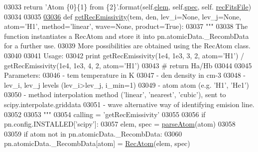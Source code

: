 \begin{DoxyCode}
{{{{{{{{{{{{{{{{{{{{{{03033         \textcolor{keywordflow}{return} \textcolor{stringliteral}{'Atom \{0\}\{1\} from \{2\}'}.format(self.\hyperlink{classpyneb_1_1core_1_1pynebcore_1_1_rec_atom_a1325fff2854658752d522c7284df5a8a}{elem}, self.\hyperlink{classpyneb_1_1core_1_1pynebcore_1_1_rec_atom_ac2485287f7694915959ba49b9b82e483}{spec}, self.
      \hyperlink{classpyneb_1_1core_1_1pynebcore_1_1_rec_atom_a2108a27da329b8599357e990a446faae}{recFitsFile})
03034         
03035 
\hypertarget{pynebcore_8py_source_l03036}{}\hyperlink{namespacepyneb_1_1core_1_1pynebcore_aba9d4a5306330dd47f8a51455514c017}{03036} \textcolor{keyword}{def }\hyperlink{namespacepyneb_1_1core_1_1pynebcore_aba9d4a5306330dd47f8a51455514c017}{getRecEmissivity}(tem, den, lev\_i=None, lev\_j=None, atom='H1', method='linear', 
      wave=None, product=True):
03037     \textcolor{stringliteral}{"""}
03038 \textcolor{stringliteral}{    The function instantiates a RecAtom and store it into pn.atomicData.\_RecombData for a further use.}
03039 \textcolor{stringliteral}{    More possibilities are obtained using the RecAtom class.}
03040 \textcolor{stringliteral}{}
03041 \textcolor{stringliteral}{    Usage:}
03042 \textcolor{stringliteral}{        print getRecEmissivity(1e4, 1e3, 3, 2, atom='H1') / getRecEmissivity(1e4, 1e3, 4, 2, atom='H1')  }
03043 \textcolor{stringliteral}{            # return Ha/Hb }
03044 \textcolor{stringliteral}{}
03045 \textcolor{stringliteral}{    Parameters:}
03046 \textcolor{stringliteral}{        - tem           temperature in K}
03047 \textcolor{stringliteral}{        - den           density in cm-3}
03048 \textcolor{stringliteral}{        - lev\_i, lev\_j  levels (lev\_i>lev\_j, i\_min=1)}
03049 \textcolor{stringliteral}{        - atom          atom (e.g. 'H1', 'He1')}
03050 \textcolor{stringliteral}{        - method        interpolation method ('linear', 'nearest', 'cubic'), sent to
       scipy.interpolate.griddata}
03051 \textcolor{stringliteral}{        - wave          alternative way of identifying emision line.}
03052 \textcolor{stringliteral}{        }
03053 \textcolor{stringliteral}{    """}
03054     calling = \textcolor{stringliteral}{'getRecEmissivity'}
03055     
03056     \textcolor{keywordflow}{if} pn.config.INSTALLED[\textcolor{stringliteral}{'scipy'}]:
03057         elem, spec = \hyperlink{namespacepyneb_1_1utils_1_1misc_a8c069186002a3e73dd474958e35034d5}{parseAtom}(atom)
03058     
03059         \textcolor{keywordflow}{if} atom \textcolor{keywordflow}{not} \textcolor{keywordflow}{in} pn.atomicData.\_RecombData:
03060             pn.atomicData.\_RecombData[atom] = \hyperlink{classpyneb_1_1core_1_1pynebcore_1_1_rec_atom}{RecAtom}(elem, spec)
}}}}}}}}}}}}}}}}}}}}}}
\end{DoxyCode}
